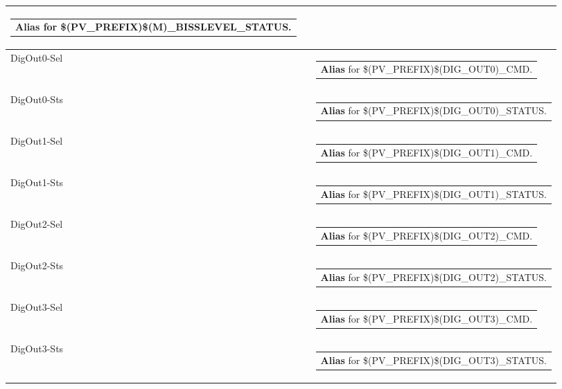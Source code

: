 \documentclass[openany]{article}
\begin{document}
\begin{longtable}{| m{4.5cm} m{2.5cm}  m{8.0cm} |}
\begin{tabular}{@{}m{6cm}@{}}
                \textbf{Alias} for \$(PV\_PREFIX)\$(M)\_BISSLEVEL\_STATUS.
            \end{tabular} \hypertarget{}{}\\ \hline
        DigOut0-Sel &  & \begin{tabular}{@{}m{6cm}@{}}
                \textbf{Alias} for \$(PV\_PREFIX)\$(DIG\_OUT0)\_CMD.
            \end{tabular} \hypertarget{}{}\\ \hline
        DigOut0-Sts &  & \begin{tabular}{@{}m{6cm}@{}}
                \textbf{Alias} for \$(PV\_PREFIX)\$(DIG\_OUT0)\_STATUS.
            \end{tabular} \hypertarget{}{}\\ \hline
        DigOut1-Sel &  & \begin{tabular}{@{}m{6cm}@{}}
                \textbf{Alias} for \$(PV\_PREFIX)\$(DIG\_OUT1)\_CMD.
            \end{tabular} \hypertarget{}{}\\ \hline
        DigOut1-Sts &  & \begin{tabular}{@{}m{6cm}@{}}
                \textbf{Alias} for \$(PV\_PREFIX)\$(DIG\_OUT1)\_STATUS.
            \end{tabular} \hypertarget{}{}\\ \hline
        DigOut2-Sel &  & \begin{tabular}{@{}m{6cm}@{}}
                \textbf{Alias} for \$(PV\_PREFIX)\$(DIG\_OUT2)\_CMD.
            \end{tabular} \hypertarget{}{}\\ \hline
        DigOut2-Sts &  & \begin{tabular}{@{}m{6cm}@{}}
                \textbf{Alias} for \$(PV\_PREFIX)\$(DIG\_OUT2)\_STATUS.
            \end{tabular} \hypertarget{}{}\\ \hline
        DigOut3-Sel &  & \begin{tabular}{@{}m{6cm}@{}}
                \textbf{Alias} for \$(PV\_PREFIX)\$(DIG\_OUT3)\_CMD.
            \end{tabular} \hypertarget{}{}\\ \hline
        DigOut3-Sts &  & \begin{tabular}{@{}m{6cm}@{}}
                \textbf{Alias} for \$(PV\_PREFIX)\$(DIG\_OUT3)\_STATUS.

\end{tabular}
\end{longtable}
\end{document}

